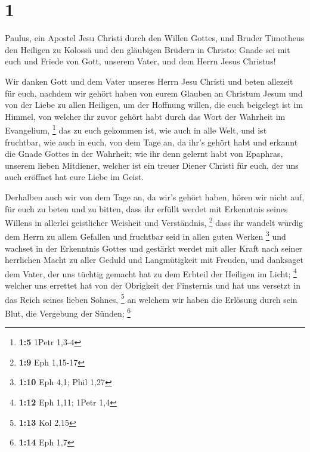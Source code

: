 \hypertarget{section}{%
\section{1}\label{section}}

 Paulus, ein Apostel Jesu Christi durch den Willen Gottes,
und Bruder Timotheus  den Heiligen zu Kolossä und den
gläubigen Brüdern in Christo: Gnade sei mit euch und Friede von Gott,
unserem Vater, und dem Herrn Jesus Christus!

 Wir danken Gott und dem Vater unseres Herrn Jesu Christi
und beten allezeit für euch,  nachdem wir gehört haben von
eurem Glauben an Christum Jesum und von der Liebe zu allen Heiligen,
 um der Hoffnung willen, die euch beigelegt ist im Himmel,
von welcher ihr zuvor gehört habt durch das Wort der Wahrheit im
Evangelium, \footnote{\textbf{1:5} 1Petr 1,3-4}  das zu
euch gekommen ist, wie auch in alle Welt, und ist fruchtbar, wie auch in
euch, von dem Tage an, da ihr's gehört habt und erkannt die Gnade Gottes
in der Wahrheit;  wie ihr denn gelernt habt von Epaphras,
unserem lieben Mitdiener, welcher ist ein treuer Diener Christi für
euch,  der uns auch eröffnet hat eure Liebe im Geist.

 Derhalben auch wir von dem Tage an, da wir's gehört
haben, hören wir nicht auf, für euch zu beten und zu bitten, dass ihr
erfüllt werdet mit Erkenntnis seines Willens in allerlei geistlicher
Weisheit und Verständnis, \footnote{\textbf{1:9} Eph 1,15-17}
 dass ihr wandelt würdig dem Herrn zu allem Gefallen und
fruchtbar seid in allen guten Werken \footnote{\textbf{1:10} Eph 4,1;
  Phil 1,27}  und wachset in der Erkenntnis Gottes und
gestärkt werdet mit aller Kraft nach seiner herrlichen Macht zu aller
Geduld und Langmütigkeit mit Freuden,  und danksaget dem
Vater, der uns tüchtig gemacht hat zu dem Erbteil der Heiligen im Licht;
\footnote{\textbf{1:12} Eph 1,11; 1Petr 1,4}  welcher uns
errettet hat von der Obrigkeit der Finsternis und hat uns versetzt in
das Reich seines lieben Sohnes, \footnote{\textbf{1:13} Kol 2,15}
 an welchem wir haben die Erlösung durch sein Blut, die
Vergebung der Sünden; \footnote{\textbf{1:14} Eph 1,7}

